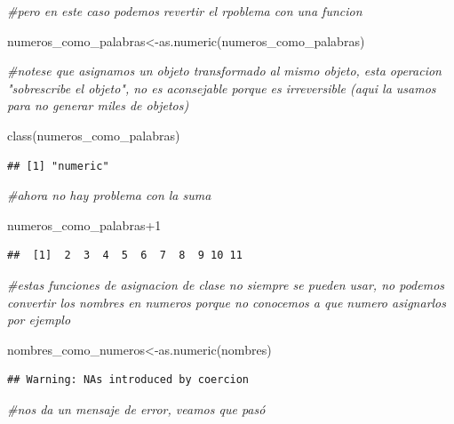 \documentclass[
]{book}
\newenvironment{Shaded}{\begin{snugshade}}{\end{snugshade}}
\newcommand{\CommentTok}[1]{\textcolor[rgb]{0.56,0.35,0.01}{\textit{#1}}}
\newcommand{\DecValTok}[1]{\textcolor[rgb]{0.00,0.00,0.81}{#1}}
\newcommand{\FunctionTok}[1]{\textcolor[rgb]{0.00,0.00,0.00}{#1}}
\newcommand{\NormalTok}[1]{#1}
\newcommand{\OtherTok}[1]{\textcolor[rgb]{0.56,0.35,0.01}{#1}}
\newcommand{\SpecialCharTok}[1]{\textcolor[rgb]{0.00,0.00,0.00}{#1}}
\begin{document}
\begin{Shaded}
\begin{Highlighting}[]
\CommentTok{\#pero en este caso podemos revertir el rpoblema con una funcion}

\NormalTok{numeros\_como\_palabras}\OtherTok{\textless{}{-}}\FunctionTok{as.numeric}\NormalTok{(numeros\_como\_palabras)}

\CommentTok{\#notese que asignamos un objeto transformado al mismo objeto, esta operacion "sobrescribe el objeto", no es aconsejable porque es irreversible (aqui la usamos para no generar miles de objetos)}

\FunctionTok{class}\NormalTok{(numeros\_como\_palabras)}
\end{Highlighting}
\end{Shaded}

\begin{verbatim}
## [1] "numeric"
\end{verbatim}

\begin{Shaded}
\begin{Highlighting}[]
\CommentTok{\#ahora no hay problema con la suma}

\NormalTok{numeros\_como\_palabras}\SpecialCharTok{+}\DecValTok{1}
\end{Highlighting}
\end{Shaded}

\begin{verbatim}
##  [1]  2  3  4  5  6  7  8  9 10 11
\end{verbatim}

\begin{Shaded}
\begin{Highlighting}[]
\CommentTok{\#estas funciones de asignacion de clase no siempre se pueden usar, no podemos convertir los nombres en numeros porque no conocemos a que numero asignarlos por ejemplo}

\NormalTok{nombres\_como\_numeros}\OtherTok{\textless{}{-}}\FunctionTok{as.numeric}\NormalTok{(nombres)}
\end{Highlighting}
\end{Shaded}

\begin{verbatim}
## Warning: NAs introduced by coercion
\end{verbatim}

\begin{Shaded}
\begin{Highlighting}[]
\CommentTok{\#nos da un mensaje de error, veamos que pasó}
\end{Highlighting}
\end{Shaded}
\end{document}

